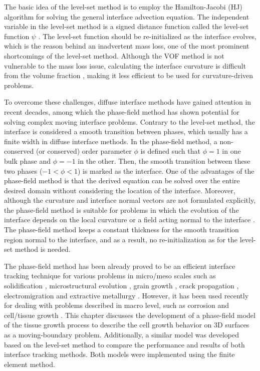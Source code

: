 
The basic idea of the level-set method is to employ the Hamilton-Jacobi (\gls{HJ}) algorithm for solving the general interface advection equation. The independent variable in the level-set method is a signed distance function called the level-set function $\psi$ \cite{RonaldFedkiw2002}. The level-set function should be re-initialized as the interface evolves, which is the reason behind an inadvertent mass loss, one of the most prominent shortcomings of the level-set method. Although the \gls{VOF} method is not vulnerable to the mass loss issue, calculating the interface curvature is difficult from the volume fraction \cite{Sun2007}, making it less efficient to be used for curvature-driven problems.

To overcome these challenges, diffuse interface methods \cite{Anderson1998} have gained attention in recent decades, among which the phase-field method has shown potential for solving complex moving interface problems. Contrary to the level-set method, the interface is considered a smooth transition between phases, which usually has a finite width in diffuse interface methods. In the phase-field method, a non-conserved (or conserved) order parameter $\phi$ is defined such that $\phi=1$ in one bulk phase and $\phi=-1$ in the other. Then, the smooth transition between these two phases ($-1<\phi<1$) is marked as the interface. One of the advantages of the phase-field method is that the derived equation can be solved over the entire desired domain without considering the location of the interface. Moreover, although the curvature and interface normal vectors are not formulated explicitly, the phase-field method is suitable for problems in which the evolution of the interface depends on the local curvature or a field acting normal to the interface \cite{Sun2007}. The phase-field method keeps a constant thickness for the smooth transition region normal to the interface, and as a result, no re-initialization as for the level-set method is needed.



The phase-field method has been already proved to be an efficient interface tracking technique for various problems in micro/meso scales such as solidification \cite{Karma1998,Boettinger2002}, microstructural evolution \cite{Chen2002}, grain growth \cite{Chen1994}, crack propagation \cite{Henry2004,Spatschek2011}, electromigration \cite{Bhate2000} and extractive metallurgy \cite{Bellemans2017}. However, it has been used recently for dealing with problems described in macro level, such as corrosion \cite{Mai2016,Lin2019,Imanian2018,Lin2020,Ansari2018,Tsuyuki2018,Chadwick2018} and cell/tissue growth \cite{Jeong2017,Lee2019}. This chapter discusses the development of a phase-field model of the tissue growth process to describe the cell growth behavior on 3D surfaces as a moving-boundary problem. Additionally, a similar model was developed based on the level-set method to compare the performance and results of both interface tracking methods. Both models were implemented using the finite element method.


